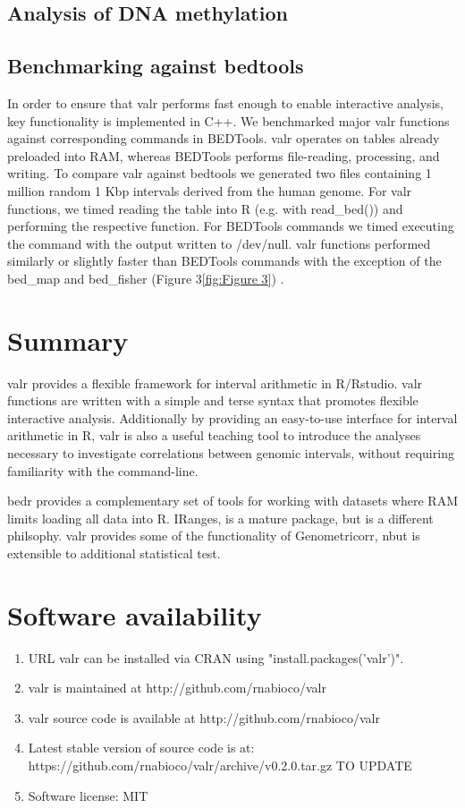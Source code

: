 \documentclass[9pt,a4paper]{extarticle}
\begin{document}
\subsection*{Analysis of DNA methylation}

\subsection*{Benchmarking against bedtools}
In order to ensure that valr performs fast enough to enable interactive analysis, key functionality is implemented in C++. We benchmarked major valr functions against corresponding commands in BEDTools. valr operates on tables already preloaded into RAM, whereas BEDTools performs file-reading, processing, and writing. To compare valr against bedtools we generated two files containing 1 million random 1 Kbp intervals derived from the human genome. For valr functions, we timed reading the table into R (e.g. with read\_bed()) and performing the respective function. For BEDTools commands we timed executing the command with the output written to /dev/null. valr functions performed similarly or slightly faster than BEDTools commands with the exception of the bed\_map and bed\_fisher (Figure 3\ref{fig:Figure 3}) . 

\section*{Summary} %
valr provides a flexible framework for interval arithmetic in R/Rstudio. valr functions are written with a simple and terse syntax that promotes flexible interactive analysis. Additionally by providing an easy-to-use interface for interval arithmetic in R, valr is also a useful teaching tool to introduce the analyses necessary to investigate correlations between genomic intervals, without requiring familiarity with the command-line.

bedr provides a complementary set of tools for working with datasets where RAM limits loading all data into R. IRanges, is a mature package, but is a different philsophy. valr provides some of the functionality of Genometricorr, nbut is extensible to additional statistical test. 

\section*{Software availability}
\begin{enumerate}
\item URL valr can be installed via CRAN using "install.packages('valr')". 
\item valr is maintained at http://github.com/rnabioco/valr
\item valr source code is available at http://github.com/rnabioco/valr
\item Latest stable version of source code is at: https://github.com/rnabioco/valr/archive/v0.2.0.tar.gz TO UPDATE
\item Software license: MIT 
\end{enumerate}
\end{document}
